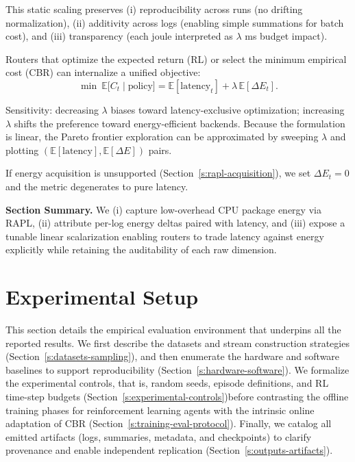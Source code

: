 This static scaling preserves (i) reproducibility across runs (no drifting normalization), (ii) additivity across logs (enabling simple summations for batch cost), and (iii) transparency (each joule interpreted as $\lambda$ ms budget impact).

Routers that optimize the expected return (RL) or select the minimum empirical cost (CBR) can internalize a unified objective:
\[
\min \ \mathbb{E}\big[C_t \mid \text{policy}\big] = \mathbb{E}[\text{latency}_t] + \lambda \,\mathbb{E}[\Delta E_t].
\]

Sensitivity: decreasing $\lambda$ biases toward latency-exclusive optimization; increasing $\lambda$ shifts the preference toward energy-efficient backends. Because the formulation is linear, the Pareto frontier exploration can be approximated by sweeping $\lambda$ and plotting $(\mathbb{E}[\text{latency}], \mathbb{E}[\Delta E])$ pairs.

If energy acquisition is unsupported (Section~\ref{s:rapl-acquisition}), we set $\Delta E_t = 0$ and the metric degenerates to pure latency.

\bigskip
\noindent\textbf{Section Summary.} We (i) capture low-overhead CPU package energy via RAPL, (ii) attribute per-log energy deltas paired with latency, and (iii) expose a tunable linear scalarization enabling routers to trade latency against energy explicitly while retaining the auditability of each raw dimension.






\section{Experimental Setup}\label{s:experimental-setup} 

This section details the empirical evaluation environment that underpins all the reported results. We first describe the datasets and stream construction strategies (Section~\ref{s:datasets-sampling}), and then enumerate the hardware and software baselines to support reproducibility (Section~\ref{s:hardware-software}). We formalize the experimental controls, that is, random seeds, episode definitions, and RL time-step budgets (Section~\ref{s:experimental-controls})before contrasting the offline training phases for reinforcement learning agents with the intrinsic online adaptation of CBR (Section~\ref{s:training-eval-protocol}). Finally, we catalog all emitted artifacts (logs, summaries, metadata, and checkpoints) to clarify provenance and enable independent replication (Section~\ref{s:outputs-artifacts}).

